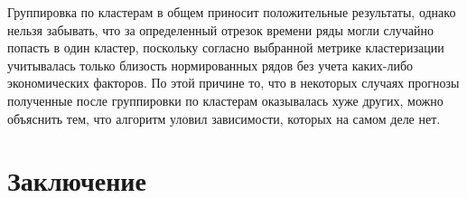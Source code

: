 \documentclass[12pt,a4paper, oneside]{extreport}
\begin{document}
Группировка по кластерам в общем  приносит положительные результаты, однако нельзя забывать, что за определенный отрезок  времени ряды могли случайно попасть в один кластер, поскольку согласно выбранной метрике кластеризации учитывалась только близость нормированных рядов без учета каких-либо экономических факторов. По этой причине то, что  в некоторых случаях  прогнозы полученные после группировки по кластерам оказывалась хуже других, можно объяснить  тем, что  алгоритм  уловил зависимости, которых на самом деле нет.  



%
%



\chapter*{Заключение}
\end{document}
